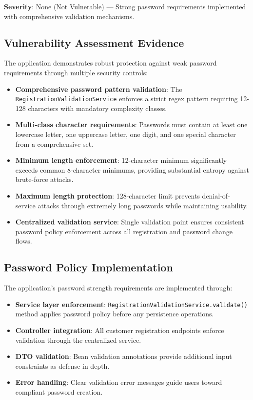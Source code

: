 \documentclass[]{UCD_CS_FYP_Report}
\begin{document}
\textbf{Severity}: None (Not Vulnerable) — Strong password requirements implemented with comprehensive validation mechanisms.

\subsection{Vulnerability Assessment Evidence}
The application demonstrates robust protection against weak password requirements through multiple security controls:
\begin{itemize}
	\item \textbf{Comprehensive password pattern validation}: The \texttt{RegistrationValidationService} enforces a strict regex pattern requiring 12-128 characters with mandatory complexity classes.
	\item \textbf{Multi-class character requirements}: Passwords must contain at least one lowercase letter, one uppercase letter, one digit, and one special character from a comprehensive set.
	\item \textbf{Minimum length enforcement}: 12-character minimum significantly exceeds common 8-character minimums, providing substantial entropy against brute-force attacks.
	\item \textbf{Maximum length protection}: 128-character limit prevents denial-of-service attacks through extremely long passwords while maintaining usability.
	\item \textbf{Centralized validation service}: Single validation point ensures consistent password policy enforcement across all registration and password change flows.
\end{itemize}

\subsection{Password Policy Implementation}
The application's password strength requirements are implemented through:
\begin{itemize}
	\item \textbf{Service layer enforcement}: \texttt{RegistrationValidationService.validate()} method applies password policy before any persistence operations.
	\item \textbf{Controller integration}: All customer registration endpoints enforce validation through the centralized service.
	\item \textbf{DTO validation}: Bean validation annotations provide additional input constraints as defense-in-depth.
	\item \textbf{Error handling}: Clear validation error messages guide users toward compliant password creation.
\end{itemize}
\end{document}
